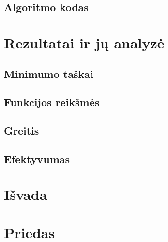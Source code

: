 \documentclass{article}
\begin{document}
\subsection{Algoritmo kodas}
\section{Rezultatai ir jų analyzė}
\subsection{Minimumo taškai}
\subsection{Funkcijos reikšmės}
\subsection{Greitis}
\subsection{Efektyvumas}
\section{Išvada}
\section{Priedas}
\end{document}
